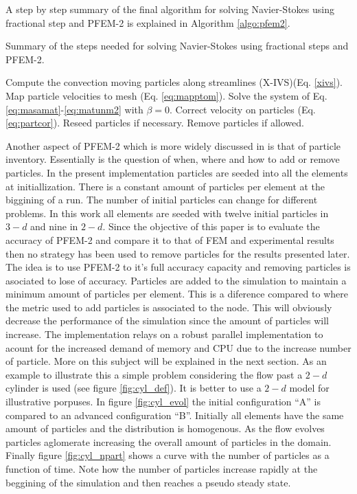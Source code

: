 A step by step summary of the final algorithm for solving Navier-Stokes using fractional step and PFEM-2 is explained in Algorithm \ref{algo:pfem2}.
\begin{algorithm}[H]
\caption{Summary of the steps needed for solving Navier-Stokes using fractional steps and PFEM-2.}
\label{algo:pfem2}
\begin{algorithmic}[1]
\STATE Compute the convection moving particles along streamlines (X-IVS)(Eq. \ref{xivs}).
\STATE Map particle velocities to mesh (Eq. \ref{eq:mapptom}).
\STATE Solve the system of Eq. \ref{eq:masamat}-\ref{eq:matunm2} with $\beta=0$.
\STATE Correct velocity on particles (Eq. \ref{eq:partcor}).
\STATE Reseed particles if necessary.
\STATE Remove particles if allowed.
\end{algorithmic}
\end{algorithm} 


Another aspect of PFEM-2 which is more widely discussed in \cite{gimenez-difusion} is that of particle inventory. Essentially is the question of when, where and how to add or remove particles. In the present implementation particles are seeded into all the elements at initiallization. There is a constant amount of particles per element at the biggining of a run. The number of initial particles can change for different problems. In this work all elements are seeded with twelve initial particles in $3-d$ and nine in $2-d$. Since the objective of this paper is to evaluate the accuracy of PFEM-2 and compare it to that of FEM and experimental results then no strategy has been used to remove particles for the results presented later. The idea is to use PFEM-2 to it's full accuracy capacity and removing particles is asociated to lose of accuracy. Particles are added to the simulation to maintain a minimum amount of particles per element. This is a diference compared to \cite{gimenez-difusion} where the metric used to add particles is associated to the node. This will obviously decrease the performance of the simulation since the amount of particles will increase. The implementation relays on a robust parallel implementation to acount for the increased demand of memory and CPU due to the increase number of particle. More on this subject will be explained in the next section. As an example to illustrate this a simple problem considering the flow past a $2-d$ cylinder is used (see figure \ref{fig:cyl_def}). It is better to use a $2-d$ model for illustrative porpuses. In figure \ref{fig:cyl_evol} the initial configuration ``A'' is compared to an advanced configuration ``B''. Initially all elements have the same amount of particles and the distribution is homogenous. As the flow evolves particles aglomerate increasing the overall amount of particles in the domain. Finally figure \ref{fig:cyl_npart} shows a curve with the number of particles as a function of time. Note how the number of particles increase rapidly at the beggining of the simulation and then reaches a pseudo steady state.


